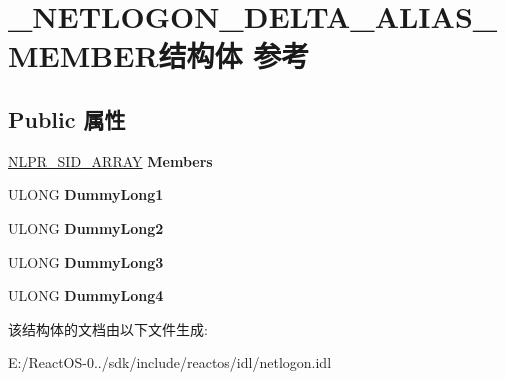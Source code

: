 \hypertarget{struct___n_e_t_l_o_g_o_n___d_e_l_t_a___a_l_i_a_s___m_e_m_b_e_r}{}\section{\+\_\+\+N\+E\+T\+L\+O\+G\+O\+N\+\_\+\+D\+E\+L\+T\+A\+\_\+\+A\+L\+I\+A\+S\+\_\+\+M\+E\+M\+B\+E\+R结构体 参考}
\label{struct___n_e_t_l_o_g_o_n___d_e_l_t_a___a_l_i_a_s___m_e_m_b_e_r}
\subsection*{Public 属性}
\begin{DoxyCompactItemize}
\item 
\mbox{\label{struct___n_e_t_l_o_g_o_n___d_e_l_t_a___a_l_i_a_s___m_e_m_b_e_r_a66bd74f4f3e38b8f3af5caf2e028cee4}} 
\hyperlink{struct___n_l_p_r___s_i_d___a_r_r_a_y}{N\+L\+P\+R\+\_\+\+S\+I\+D\+\_\+\+A\+R\+R\+AY} {\bfseries Members}
\item 
\mbox{\label{struct___n_e_t_l_o_g_o_n___d_e_l_t_a___a_l_i_a_s___m_e_m_b_e_r_a7c13fcb6ab5dc8564976e921e4c1e1a1}} 
U\+L\+O\+NG {\bfseries Dummy\+Long1}
\item 
\mbox{\label{struct___n_e_t_l_o_g_o_n___d_e_l_t_a___a_l_i_a_s___m_e_m_b_e_r_a885077c03f6f03d02f7000efcd590fd9}} 
U\+L\+O\+NG {\bfseries Dummy\+Long2}
\item 
\mbox{\label{struct___n_e_t_l_o_g_o_n___d_e_l_t_a___a_l_i_a_s___m_e_m_b_e_r_afb3c4276e5c6c6f0144e1a96399bd746}} 
U\+L\+O\+NG {\bfseries Dummy\+Long3}
\item 
\mbox{\label{struct___n_e_t_l_o_g_o_n___d_e_l_t_a___a_l_i_a_s___m_e_m_b_e_r_a599fc10abe10aeafe1c8af51eeb7aee1}} 
U\+L\+O\+NG {\bfseries Dummy\+Long4}
\end{DoxyCompactItemize}


该结构体的文档由以下文件生成\+:\begin{DoxyCompactItemize}
\item 
E\+:/\+React\+O\+S-\/0../sdk/include/reactos/idl/netlogon.\+idl\end{DoxyCompactItemize}
